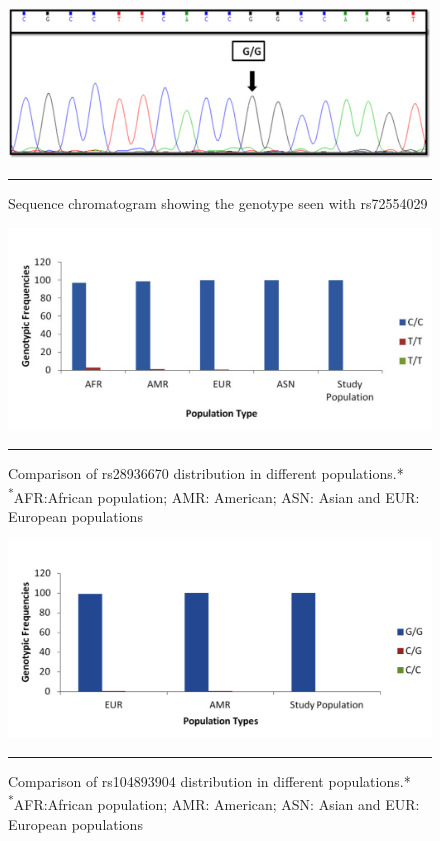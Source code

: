 \begin{refsection}
\begin{figure}[!htb]
\centering
\includegraphics[width=\linewidth]{Figures/Figure5_8.pdf}
\rule{35em}{0.5pt}
\caption[Sequence chromatogram showing the genotype seen with rs72554029]{Sequence chromatogram showing the genotype seen with rs72554029}
\label{fig:5_8}
\end{figure}


\begin{figure}[!htb]
\centering
\includegraphics[width=\linewidth]{Figures/Figure5_10.pdf}
\rule{35em}{0.5pt}
\caption[Comparison of rs28936670 distribution in different populations]{Comparison of rs28936670 distribution in different populations.*\\ {\textsuperscript{*}\footnotesize{AFR:African population; AMR: American; ASN: Asian and EUR: European populations}}}
\label{fig:5_10}
\end{figure}

\begin{figure}[!htb]
\centering
\includegraphics[width=\linewidth]{Figures/Figure5_11.pdf}
\rule{35em}{0.5pt}
\caption[Comparison of rs104893904 distribution in different populations]{Comparison of rs104893904 distribution in different populations.*\\{\textsuperscript{*}\footnotesize{AFR:African population; AMR: American; ASN: Asian and EUR: European populations}}}
\label{fig:5_11}
\end{figure}


\end{refsection}
